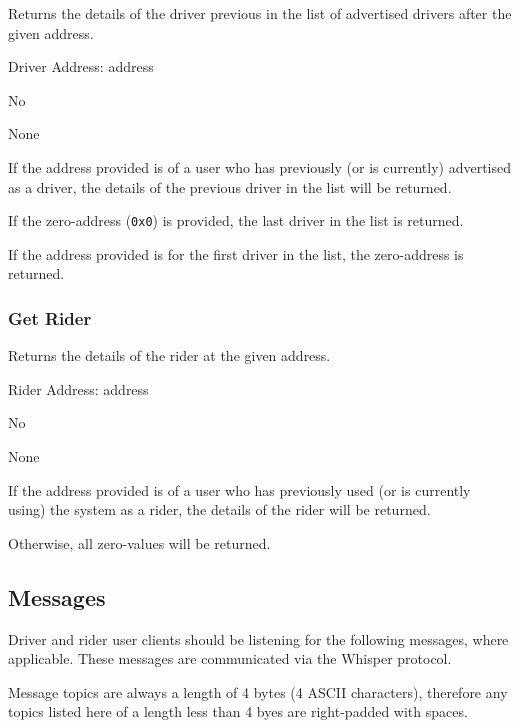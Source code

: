 \begin{description}[leftmargin=8em,style=nextline]
	\item [Description]
		Returns the details of the driver previous in the list of advertised drivers after the given address.
	\item [Arguments]
		Driver Address: address
	\item [Payable]
		No
	\item [Preconditions]
		None
	\item [Postconditions]
		If the address provided is of a user who has previously (or is currently) advertised as a driver, the details of the previous driver in the list will be returned.
		
		If the zero-address (\lstinline{0x0}) is provided, the last driver in the list is returned.
		
		If the address provided is for the first driver in the list, the zero-address is returned.
\end{description}

\subsubsection{Get Rider}

\begin{description}[leftmargin=8em,style=nextline]
	\item [Description]
		Returns the details of the rider at the given address.
	\item [Arguments]
		Rider Address: address
	\item [Payable]
		No
	\item [Preconditions]
		None
	\item [Postconditions]
		If the address provided is of a user who has previously used (or is currently using) the system as a rider, the details of the rider will be returned.
		
		Otherwise, all zero-values will be returned.
\end{description}

\subsection{Messages}

Driver and rider user clients should be listening for the following messages, where applicable. These messages are communicated via the Whisper protocol.

Message topics are always a length of 4 bytes (4 ASCII characters), therefore any topics listed here of a length less than 4 byes are right-padded with spaces.

